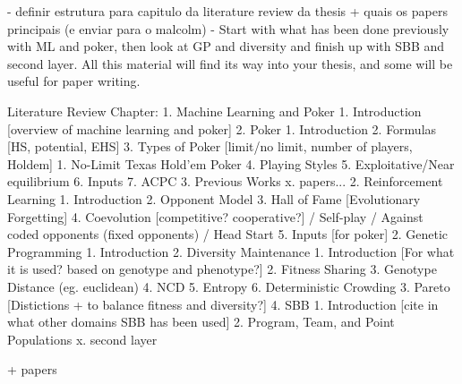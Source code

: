 - definir estrutura para capitulo da literature review da thesis + quais os papers principais (e enviar para o malcolm)
    - Start with what has been done previously with ML and poker, then look at GP and diversity and finish up with SBB and second layer. All this material will find its way into your thesis, and some will be useful for paper writing.

Literature Review Chapter:
1. Machine Learning and Poker
    1. Introduction [overview of machine learning and poker]
    2. Poker
        1. Introduction
        2. Formulas [HS, potential, EHS]
        3. Types of Poker [limit/no limit, number of players, Holdem]
            1. No-Limit Texas Hold’em Poker
        4. Playing Styles
        5. Exploitative/Near equilibrium
        6. Inputs
        7. ACPC
    3. Previous Works
        x. papers...
2. Reinforcement Learning
    1. Introduction
    2. Opponent Model
    3. Hall of Fame [Evolutionary Forgetting]
    4. Coevolution [competitive? cooperative?] / Self-play / Against coded opponents (fixed opponents) / Head Start
    5. Inputs [for poker]
2. Genetic Programming
    1. Introduction
    2. Diversity Maintenance
        1. Introduction [For what it is used? based on genotype and phenotype?]
        2. Fitness Sharing
        3. Genotype Distance (eg. euclidean)
        4. NCD
        5. Entropy
        6. Deterministic Crowding
    3. Pareto [Distictions + to balance fitness and diversity?]
4. SBB
    1. Introduction [cite in what other domains SBB has been used]
    2. Program, Team, and Point Populations
    x. second layer


+ papers